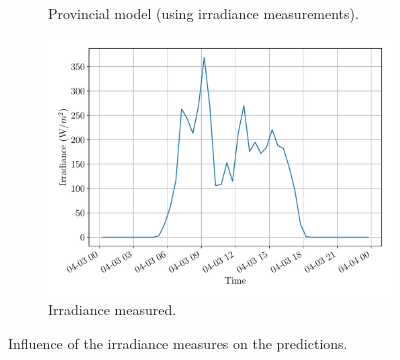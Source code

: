 \documentclass[a4paper, 12pt]{article}
\begin{document}
\begin{figure}[H]
\begin{subfigure}{0.48\textwidth}
		\caption{Provincial model (using irradiance measurements).}
	\end{subfigure}
	\hspace{0.5em}
	\begin{subfigure}{0.48\textwidth}
		\centering
		\includegraphics[width=\textwidth]{resources/pdf/irradiance_meas_for_START_FOR_03-04-2020.pdf}
		\vspace{-0.5em}
		\caption{Irradiance measured.}
	\end{subfigure}
	\caption{Influence of the irradiance measures on the predictions.}
	\label{fig:irradiance_meas_influence}
\end{figure}
\end{document}
